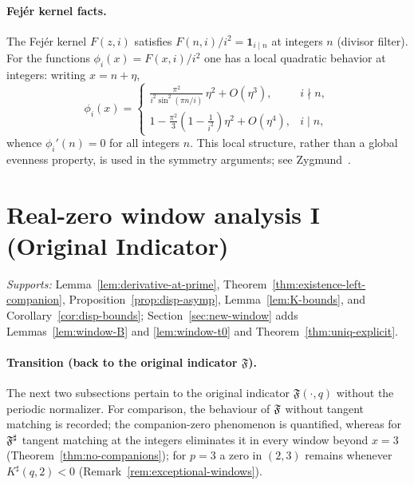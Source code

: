 \paragraph{Fejér kernel facts.}
The Fejér kernel $F(z,i)$ satisfies $F(n,i)/i^2=\mathbf 1_{i\mid n}$ at integers $n$ (divisor filter). For the functions $\phi_i(x)=F(x,i)/i^2$ one has a local quadratic behavior at integers: writing $x=n+\eta$,
\[
\phi_i(x)=
\begin{cases}
\displaystyle \frac{\pi^2}{i^2\sin^2(\pi n/i)}\,\eta^2+O(\eta^3), & i\nmid n,\\[1ex]
\displaystyle 1-\frac{\pi^2}{3}\!\left(1-\frac{1}{i^2}\right)\eta^2+O(\eta^4), & i\mid n,
\end{cases}
\]
whence $\phi_i'(n)=0$ for all integers $n$. This local structure, rather than a global evenness property, is used in the symmetry arguments; see Zygmund~\cite{zygmund2002}.

\bigskip

\section{Real-zero window analysis I (Original Indicator)}\label{app:real-zero-original}
\noindent\textit{Supports:} Lemma~\ref{lem:derivative-at-prime}, Theorem~\ref{thm:existence-left-companion}, Proposition~\ref{prop:disp-asymp}, Lemma~\ref{lem:K-bounds}, and Corollary~\ref{cor:disp-bounds}; Section~\ref{sec:new-window} adds Lemmas~\ref{lem:window-B} and \ref{lem:window-t0} and Theorem~\ref{thm:uniq-explicit}.

\paragraph{Transition (back to the original indicator $\mathfrak F$).}
The next two subsections pertain to the original indicator $\mathfrak F(\cdot,q)$ without the periodic normalizer. 
For comparison, the behaviour of $\mathfrak F$ without tangent matching is recorded; the companion-zero phenomenon is quantified, whereas for $\mathfrak F^{\sharp}$ tangent matching at the integers eliminates it in every window beyond $x=3$ (Theorem~\ref{thm:no-companions}); for $p=3$ a zero in $(2,3)$ remains whenever $K^\sharp(q,2)<0$ (Remark~\ref{rem:exceptional-windows}).


